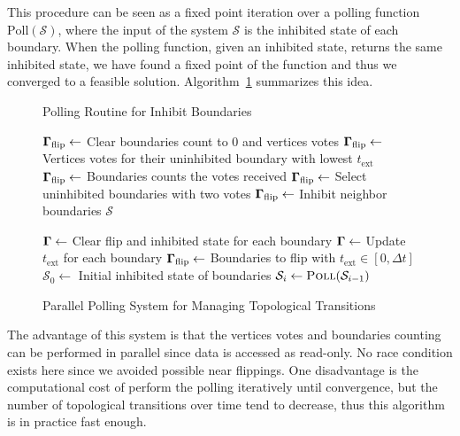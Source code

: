 This procedure can be seen as a fixed point iteration over a polling function $\text{Poll}(\mathcal{S})$, where the input of the system $\mathcal{S}$ is the inhibited state of each boundary. 
When the polling function, given an inhibited state, returns the same inhibited state, we have found a fixed point of the function and thus we converged to a feasible solution. Algorithm~\ref{alg:polling} summarizes this idea.

\begin{figure}
\begin{algorithm}[H]
\caption{Polling Routine for Inhibit Boundaries}
\label{alg:pollroutine}
\begin{algorithmic}[1]
\State $\bm{\Gamma}_{\text{flip}} \gets$ Clear boundaries count to 0 and vertices votes
\State $\bm{\Gamma}_{\text{flip}} \gets$ Vertices votes for their uninhibited boundary with lowest $t_{\text{ext}}$
\State $\bm{\Gamma}_{\text{flip}} \gets$ Boundaries counts the votes received
\State $\bm{\Gamma}_{\text{flip}} \gets$ Select uninhibited boundaries with two votes
\State $\bm{\Gamma}_{\text{flip}} \gets$ Inhibit neighbor boundaries
\State \Return $\mathcal{S}$ 
\EndProcedure
\end{algorithmic}
\end{algorithm}

\begin{algorithm}[H]
\caption{Parallel Polling System for Managing Topological Transitions}
\label{alg:polling}
\begin{algorithmic}[1]
\State $\bm{\Gamma} \gets$ Clear flip and inhibited state for each boundary
\State $\bm{\Gamma} \gets$ Update $t_{\text{ext}}$ for each boundary
\State $\bm{\Gamma}_{\text{flip}} \gets$ Boundaries to flip with $t_{\text{ext}} \in [0, \Delta t]$
\State $\mathcal{S}_0 \gets$ Initial inhibited state of boundaries
    \State $\mathcal{S}_i \gets \textsc{Poll}(\mathcal{S}_{i-1})$
    \State \Return
    \EndIf
\EndFor
\EndProcedure
\end{algorithmic}
\end{algorithm}
\end{figure}

The advantage of this system is that the vertices votes and boundaries counting can be performed in parallel since data is accessed as read-only. 
No race condition exists here since we avoided possible near flippings. 
One disadvantage is the computational cost of perform the polling iteratively until convergence, but the number of topological transitions over time tend to decrease, thus this algorithm is in practice fast enough.
